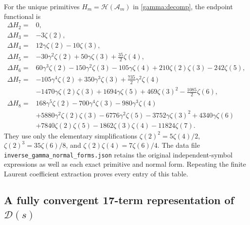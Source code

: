 \documentclass[11pt,a4paper]{article}
\numberwithin{equation}{section}
\theoremstyle{definition}
\theoremstyle{remark}
\newcommand{\A}{\mathcal A}
\newcommand{\HH}{\mathcal H}
\begin{document}
For the unique primitives $H_m=\HH(\A_m)$ in
\eqref{gamma:decomp}, the endpoint functional is
\begin{align*}
 \Delta H_2={}&0,\\
 \Delta H_3={}&-3\zeta(2),\\
 \Delta H_4={}&12\gamma\zeta(2)-10\zeta(3),\\
 \Delta H_5={}&-30\gamma^2\zeta(2)+50\gamma\zeta(3)
                                      +\tfrac{35}{2}\zeta(4),\\
 \Delta H_6={}&60\gamma^3\zeta(2)-150\gamma^2\zeta(3)
 -105\gamma\zeta(4)+210\zeta(2)\zeta(3)-242\zeta(5),\\
 \Delta H_7={}&-105\gamma^4\zeta(2)+350\gamma^3\zeta(3)
                     +\tfrac{735}{2}\gamma^2\zeta(4)\\
 &-1470\gamma\zeta(2)\zeta(3)+1694\gamma\zeta(5)
                +469\zeta(3)^2-\tfrac{1085}{2}\zeta(6),\\
 \Delta H_8={}&168\gamma^5\zeta(2)-700\gamma^4\zeta(3)
                          -980\gamma^3\zeta(4)\\
 &+5880\gamma^2\zeta(2)\zeta(3)-6776\gamma^2\zeta(5)
             -3752\gamma\zeta(3)^2+4340\gamma\zeta(6)\\
 &+7840\zeta(2)\zeta(5)-1862\zeta(3)\zeta(4)-11824\zeta(7).
\end{align*}
They use only the elementary simplifications
$\zeta(2)^2=5\zeta(4)/2$,
$\zeta(2)^3=35\zeta(6)/8$, and
$\zeta(2)\zeta(4)=7\zeta(6)/4$.
The data file \texttt{inverse\_gamma\_normal\_forms.json} retains
the original independent-symbol expressions as well as each exact
primitive and normal form.  Repeating the finite Laurent coefficient
extraction proves every entry of this table.

\subsection{A fully convergent 17-term representation of \texorpdfstring{$\mathcal D(s)$}{D(s)}}
\label{tables:omega-convergent}
\end{document}
